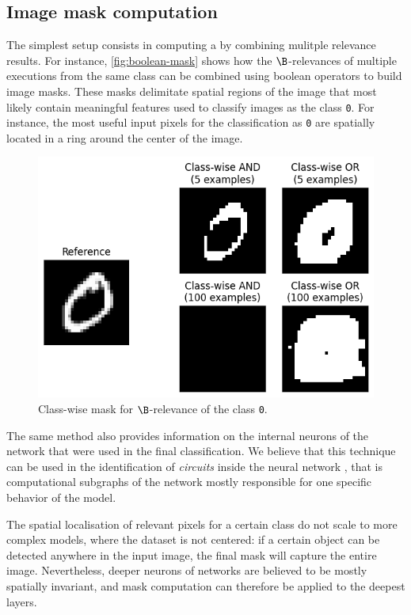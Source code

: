 \documentclass[twocolumn]{../cs-classes/cs-classes}
\newcommand*{\1}{\digitsbb{1}}
\newcommand*{\0}{\digitsbb{0}}
\begin{document}
\subsection{Image mask computation}
The simplest setup consists in computing a  by combining mulitple relevance results. For instance, \autoref{fig:boolean-mask} shows how the $\B$-relevances of multiple executions from the same class can be combined using boolean operators to build image masks. These masks delimitate spatial regions of the image that most likely contain meaningful features used to classify images as the class \texttt{0}. For instance, the most useful input pixels for the classification as \texttt{0} are spatially located in a ring around the center of the image.
\begin{figure}[H]
    \centering
    \includegraphics[width=.9\linewidth]{boolean-mask.png}
    \caption{Class-wise mask for $\B$-relevance of the class \texttt{0}.}
    \label{fig:boolean-mask}
\end{figure}
The same method also provides information on the internal neurons of the network that were used in the final classification. We believe that this technique can be used in the identification of \emph{circuits} inside the neural network \cite{circuits}, that is computational subgraphs of the network mostly responsible for one specific behavior of the model.

The spatial localisation of relevant pixels for a certain class do not scale to more complex models, where the dataset is not centered: if a certain object can be detected anywhere in the input image, the final mask will capture the entire image. Nevertheless, deeper neurons of networks are believed to be mostly spatially invariant, and mask computation can therefore be applied to the deepest layers.
\end{document}
